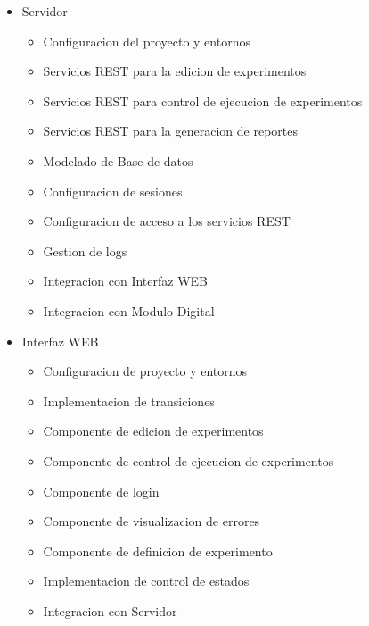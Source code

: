 \begin{itemize}
    \item Servidor
        \begin{itemize}
        \item Configuracion del proyecto y entornos
        \item Servicios REST para la edicion de experimentos
        \item Servicios REST para control de ejecucion de experimentos
        \item Servicios REST para la generacion de reportes
        \item Modelado de Base de datos 
        \item Configuracion de sesiones
        \item Configuracion de acceso a los servicios REST
        \item Gestion de logs
        \item Integracion con Interfaz WEB
        \item Integracion con Modulo Digital
        \end{itemize}
    \item Interfaz WEB
        \begin{itemize}
        \item Configuracion de proyecto y entornos
        \item Implementacion de transiciones
        \item Componente de edicion de experimentos
        \item Componente de control de ejecucion de experimentos
        \item Componente de login
        \item Componente de visualizacion de errores
        \item Componente de definicion de experimento
        \item Implementacion de control de estados
        \item Integracion con Servidor
        \end{itemize}
    \end{itemize}
\newpage